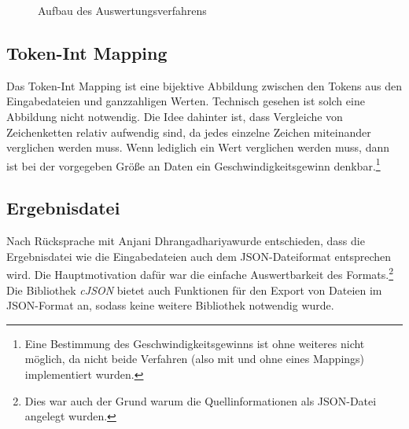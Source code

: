 \documentclass[a4paper,10pt]{article}
\newcommand{\dashAndSpace}[0]{\textendash \space}
\newcommand{\dataSource}[0]{Anjani Dhrangadhariya}
\begin{document}
\begin{figure}[H]
            \caption{Aufbau des Auswertungsverfahrens}
            \label{Proammverfahren}
        \end{figure}

    \subsection{Token-Int Mapping}
        Das Token-Int Mapping ist eine bijektive Abbildung zwischen den Tokens aus den Eingabedateien und ganzzahligen Werten. Technisch gesehen ist solch eine Abbildung nicht notwendig. Die Idee dahinter ist, dass Vergleiche von Zeichenketten relativ aufwendig sind, da jedes einzelne Zeichen miteinander verglichen werden muss. Wenn lediglich ein Wert verglichen werden muss, dann ist bei der vorgegeben Größe an Daten ein Geschwindigkeitsgewinn denkbar.\footnote{Eine Bestimmung des Geschwindigkeitsgewinns ist ohne weiteres nicht möglich, da nicht beide Verfahren (also mit und ohne eines Mappings) implementiert wurden.}

    \subsection{Ergebnisdatei}
        Nach Rücksprache mit \dataSource \space wurde entschieden, dass die Ergebnisdatei \dashAndSpace wie die Eingabedateien \dashAndSpace auch dem JSON-Dateiformat entsprechen wird. Die Hauptmotivation dafür war die einfache Auswertbarkeit des Formats.\footnote{Dies war auch der Grund warum die Quellinformationen als JSON-Datei angelegt wurden.}
        Die Bibliothek \emph{cJSON} bietet auch Funktionen für den Export von Dateien im JSON-Format an, sodass keine weitere Bibliothek notwendig wurde.
\end{document}
